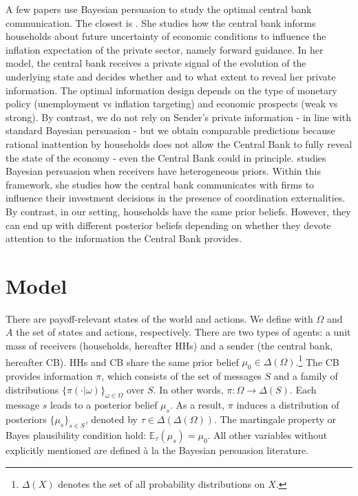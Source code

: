 \documentclass[12pt,a4paper]{article}
\begin{document}
A few papers use Bayesian persuasion to study the optimal central bank communication. The closest is \cite{Ko2022}. She studies how the central bank informs households about future uncertainty of economic conditions to influence the inflation expectation of the private sector, namely forward guidance. In her model, the central bank receives a private signal of the evolution of the underlying state and decides whether and to what extent to reveal her private information. The optimal information design depends on the type of monetary policy (unemployment vs inflation targeting) and economic prospects (weak vs strong). By contrast, we do not rely on Sender's private information - in line with standard Bayesian persuasion - but we obtain comparable predictions because rational inattention by households does not allow the Central Bank to fully reveal the state of the economy - even the Central Bank could in principle.
\cite{Herbert2021} studies Bayesian persuasion when receivers have heterogeneous priors. Within this framework, she studies how the central bank communicates with firms to influence their investment decisions in the presence of coordination externalities. By contrast, in our setting, households have the same prior beliefs. However, they can end up with different posterior beliefs depending on whether they devote attention to the information the Central Bank provides.

\section{Model}

There are payoff-relevant states of the world and actions. We define with $\Omega$ and $A$ the set of states and actions, respectively. There are two types of agents: a unit mass of receivers (households, hereafter HHs) and a sender (the central bank, hereafter CB). HHs and CB share the same prior belief $\mu_0 \in \Delta(\Omega)$.\footnote{$\Delta(X)$ denotes the set of all probability distributions on $X$.} The CB provides information $\pi$, which consists of the set of messages $S$ and a family of distributions $\{\pi(\cdot|\omega)\}_{\omega\in\Omega}$ over $S$. In other words, $\pi: \Omega \to \Delta(S)$. Each message $s$ leads to a posterior belief $\mu_s$. As a result, $\pi$ induces a distribution of posteriors $\{\mu_s\}_{s \in S}$, denoted by $\tau \in \Delta(\Delta(\Omega))$. The martingale property or Bayes plausibility condition hold: $\mathbb{E}_{\tau}(\mu_s)=\mu_0$. All other variables without explicitly mentioned are defined \`{a} la the Bayesian persuasion literature.
\end{document}
